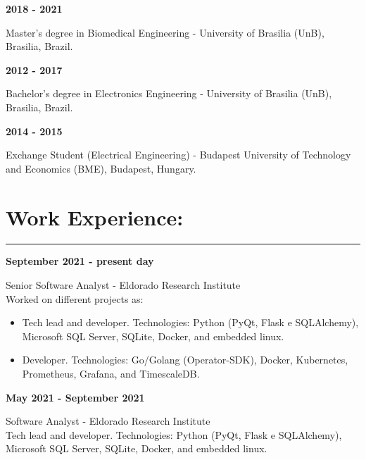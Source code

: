 \documentclass[11pt]{article}
\begin{document}
\textbf{2018 - 2021}
\begin{addmargin}{0.5cm}
Master's degree in Biomedical Engineering - University of Brasilia (UnB), Brasilia, Brazil. \\
\end{addmargin}

\textbf{2012 - 2017}
\begin{addmargin}{0.5cm}
Bachelor's degree in Electronics Engineering - University of Brasilia (UnB), Brasilia, Brazil. \\
\end{addmargin}

\textbf{2014 - 2015}
\begin{addmargin}{0.5cm}
Exchange Student (Electrical Engineering) - Budapest University of Technology and Economics (BME), Budapest, Hungary.
\end{addmargin}


\section{Work Experience:}
\hrule \vspace{0.1cm}

\textbf{September 2021 - present day}
\begin{addmargin}{0.5cm}
Senior Software Analyst - Eldorado Research Institute\\
Worked on different projects as:
\begin{itemize}
    \item Tech lead and developer. Technologies: Python (PyQt, Flask e SQLAlchemy), Microsoft SQL Server, SQLite, Docker, and embedded linux.
    \item Developer. Technologies: Go/Golang (Operator-SDK), Docker, Kubernetes, Prometheus, Grafana, and TimescaleDB. \\
\end{itemize}
\end{addmargin}

\textbf{May 2021 - September 2021}
\begin{addmargin}{0.5cm}
Software Analyst - Eldorado Research Institute\\
Tech lead and developer. Technologies: Python (PyQt, Flask e SQLAlchemy), Microsoft SQL Server, SQLite, Docker, and embedded linux.\\
\end{addmargin}
\end{document}
